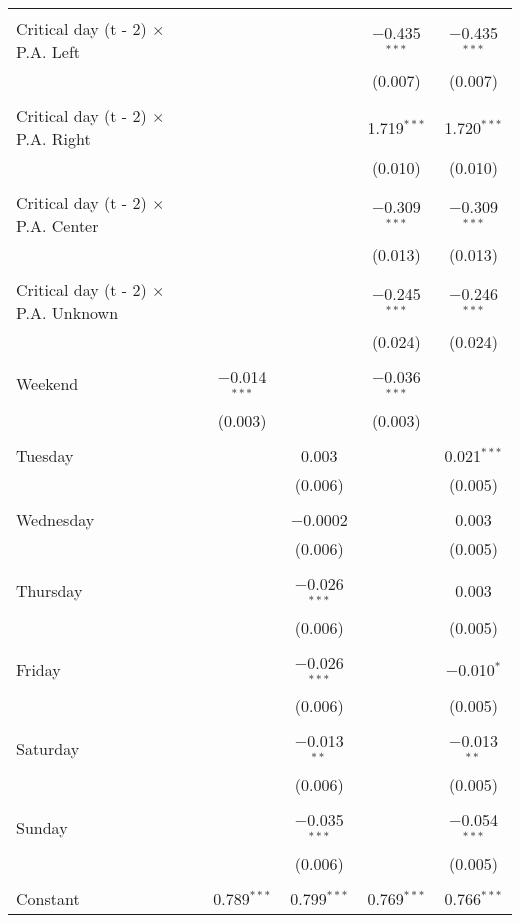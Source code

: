 \documentclass[
]{article}
\begin{document}
\begin{table}[!htbp]
{\begin{tabular}{@{\extracolsep{5pt}}lcccc}
  & & & & \\ 
 Critical day (t - 2) $\times$ P.A. Left &  &  & $-$0.435$^{***}$ & $-$0.435$^{***}$ \\ 
  &  &  & (0.007) & (0.007) \\ 
  & & & & \\ 
 Critical day (t - 2) $\times$ P.A. Right &  &  & 1.719$^{***}$ & 1.720$^{***}$ \\ 
  &  &  & (0.010) & (0.010) \\ 
  & & & & \\ 
 Critical day (t - 2) $\times$ P.A. Center &  &  & $-$0.309$^{***}$ & $-$0.309$^{***}$ \\ 
  &  &  & (0.013) & (0.013) \\ 
  & & & & \\ 
 Critical day (t - 2) $\times$ P.A. Unknown &  &  & $-$0.245$^{***}$ & $-$0.246$^{***}$ \\ 
  &  &  & (0.024) & (0.024) \\ 
  & & & & \\ 
 Weekend & $-$0.014$^{***}$ &  & $-$0.036$^{***}$ &  \\ 
  & (0.003) &  & (0.003) &  \\ 
  & & & & \\ 
 Tuesday &  & 0.003 &  & 0.021$^{***}$ \\ 
  &  & (0.006) &  & (0.005) \\ 
  & & & & \\ 
 Wednesday &  & $-$0.0002 &  & 0.003 \\ 
  &  & (0.006) &  & (0.005) \\ 
  & & & & \\ 
 Thursday &  & $-$0.026$^{***}$ &  & 0.003 \\ 
  &  & (0.006) &  & (0.005) \\ 
  & & & & \\ 
 Friday &  & $-$0.026$^{***}$ &  & $-$0.010$^{*}$ \\ 
  &  & (0.006) &  & (0.005) \\ 
  & & & & \\ 
 Saturday &  & $-$0.013$^{**}$ &  & $-$0.013$^{**}$ \\ 
  &  & (0.006) &  & (0.005) \\ 
  & & & & \\ 
 Sunday &  & $-$0.035$^{***}$ &  & $-$0.054$^{***}$ \\ 
  &  & (0.006) &  & (0.005) \\ 
  & & & & \\ 
 Constant & 0.789$^{***}$ & 0.799$^{***}$ & 0.769$^{***}$ & 0.766$^{***}$ \\ 

\end{tabular}}
\end{table}
\end{document}
